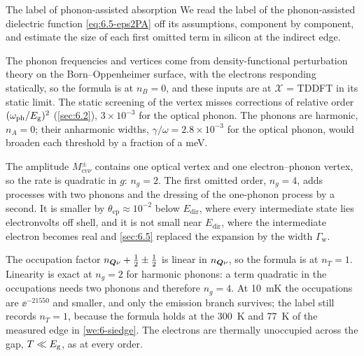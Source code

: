 \begin{workedexample}{The label of phonon-assisted absorption}\label{we:8-label}
We read the label of the phonon-assisted dielectric function \cref{eq:6.5-eps2PA} off its assumptions, component by component, and estimate the size of each first omitted term in silicon at the indirect edge.

The phonon frequencies and vertices come from density-functional perturbation theory on the Born--Oppenheimer surface, with the electrons responding statically, so the formula is at $n_B = 0$, and these inputs are at $\mathcal{X}$ = TDDFT in its static limit. The static screening of the vertex misses corrections of relative order $(\omega_{\mathrm{ph}}/E_{\mathrm{g}})^2$ (\cref{sec:6.2}), $3\times10^{-3}$ for the optical phonon. The phonons are harmonic, $n_A = 0$; their anharmonic widths, $\gamma/\omega = 2.8\times10^{-3}$ for the optical phonon, would broaden each threshold by a fraction of a meV.

The amplitude $M^\pm_{cv\nu}$ contains one optical vertex and one electron--phonon vertex, so the rate is quadratic in $g$: $n_g = 2$. The first omitted order, $n_g = 4$, adds processes with two phonons and the dressing of the one-phonon process by a second. It is smaller by $\theta_{\mathrm{ep}} \approx 10^{-2}$ below $E_{\mathrm{dir}}$, where every intermediate state lies electronvolts off shell, and it is not small near $E_{\mathrm{dir}}$, where the intermediate electron becomes real and \cref{sec:6.5} replaced the expansion by the width $\varGamma_{\mathrm{w}}$.

The occupation factor $n_{\bm{Q}\nu} + \frac12 \pm \frac12$ is linear in $n_{\bm{Q}\nu}$, so the formula is at $n_T = 1$. Linearity is exact at $n_g = 2$ for harmonic phonons: a term quadratic in the occupations needs two phonons and therefore $n_g = 4$. At \SI{10}{mK} the occupations are $\ee^{-21550}$ and smaller, and only the emission branch survives; the label still records $n_T = 1$, because the formula holds at the \SI{300}{K} and \SI{77}{K} of the measured edge in \cref{we:6-siedge}. The electrons are thermally unoccupied across the gap, $T \ll E_{\mathrm{g}}$, as at every order.


\end{workedexample}
